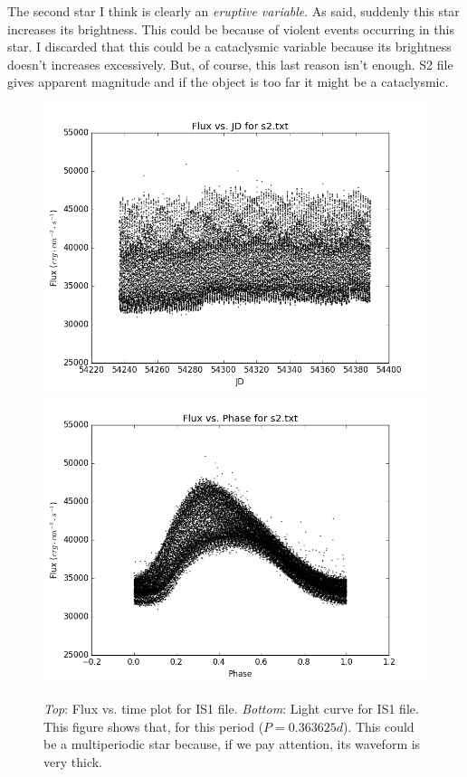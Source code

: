 \begin{enumerate} [a)]
The second star I think is clearly an \emph{eruptive variable}. As said, suddenly this star increases its brightness. This could be because of violent events occurring in this star. I discarded that this could be a cataclysmic variable because its brightness doesn't increases excessively. But, of course, this last reason isn't enough. S2 file gives apparent magnitude and if the object is too far it might be a cataclysmic.

\begin{figure}[tb]
\centering
\includegraphics[scale=0.5]{s2txt_simple_plot.png}
\includegraphics[scale=0.5]{s2txt_phase_plot.png}
\caption{\textit{Top}: Flux vs. time plot for IS1 file. \textit{Bottom}: Light curve for IS1 file. This figure shows that, for this period ($P =0.363625 d$). This could be a multiperiodic star because, if we pay attention, its waveform is very thick. }
\label{fig:F1}
\end{figure}

\end{enumerate}
